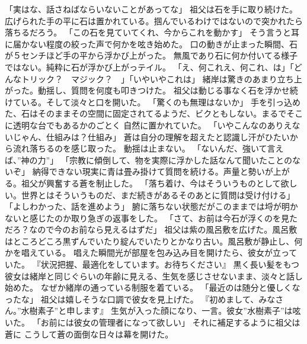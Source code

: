 \documentclass[uplatex]{utbook}
\begin{document}
「実はな、話さねばならいないことがあってな」
祖父は石を手に取り続けた。広げられた手の平に石は置かれている。掴んでいるわけではないので突かれたら落ちるだろう。
「この石を見ていてくれ、今からこれを動かす」
そう言うと耳に届かない程度の絞った声で何かを呟き始めた。
口の動きが止まった瞬間、石が５センチほど手の平から浮かび上がった。
無風であり石に何か付いてる様子ではない。純粋に石が浮かび上がっテイル。
「え、何これえ、何これ、は」「どんなトリック？　マジック？　」「いやいやこれは」
緒岸は驚きのあまり立ち上がった。動揺し、質問を何度も叩きつけた。
祖父は動じる事なく石を浮かせ続けている。そして淡々と口を開いた。
「驚くのも無理はないか」
手を引っ込めた、石はそのままその空間に固定されてるようだ、ビクともしない。まるでそこに透明な台でもあるかのごとく
自然に置かれていた。
「いやこんなのありえないじゃん、仕組みは？仕組み」
蒼は自分の理解を超えたと認識し汗がひたいから流れ落ちるのを感じ取った。
動揺は止まない。
「ないんだ、強いて言えば、”神の力”」
「宗教に傾倒して、物を実際に浮かした話なんて聞いたことのないぞ」
納得できない現実に青は畳み掛けて質問を続ける。声量と勢いが上がる。祖父が興奮する蒼を制止した。
「落ち着け、今はそういうものとして欲しい。世界とはそういうものだ、まだ続きがあるそのあとに質問は受け付ける」
「よしわかった、話を進めよう」
腑に落ちない状態だがこのままでは埒が明かないと感じたのか取り急ぎの返事をした。
「さて、お前は今石が浮くのを見ただろ？なので今のお前なら見えるはずだ」
祖父は紫の風呂敷を広げた。風呂敷はところどころ黒ずんでいたり綻んでいたりとかなり古い。風呂敷が静止し、何かを唱えている。
唱えた瞬間光が部屋を包み込み目を開けたら、彼女が立っていた。
『状況把握、最適化をしています。お待ちください』
黒く長い髪をもつ彼女は緒岸と同じぐらいの年齢に見える、生気を感じさせないまま、淡々と話し始めた。
なぜか緒岸の通っている制服を着ている。
「最近のは随分と優しくなったな」
祖父は嬉しそうな口調で彼女を見上げた。
『初めまして、みなさん。”水樹素子”と申します』
生気が入った顔になり、一言。彼女”水樹素子”は呟いた。
「お前には彼女の管理者になって欲しい」
それに補足するように祖父は蒼に
こうして蒼の面倒な日々は幕を開けた。
\end{document}
